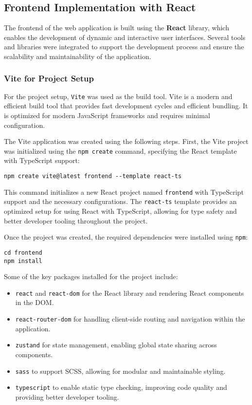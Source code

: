 \subsection{Frontend Implementation with React}

The frontend of the web application is built using the \textbf{React} library, which enables the development of dynamic and interactive user interfaces. Several tools and libraries were integrated to support the development process and ensure the scalability and maintainability of the application.

\subsubsection{Vite for Project Setup}

For the project setup, \texttt{Vite} was used as the build tool. Vite is a modern and efficient build tool that provides fast development cycles and efficient bundling. It is optimized for modern JavaScript frameworks and requires minimal configuration.

The Vite application was created using the following steps. First, the Vite project was initialized using the \texttt{npm create} command, specifying the React template with TypeScript support:

\begin{verbatim}
npm create vite@latest frontend --template react-ts
\end{verbatim}

This command initializes a new React project named \texttt{frontend} with TypeScript support and the necessary configurations. The \texttt{react-ts} template provides an optimized setup for using React with TypeScript, allowing for type safety and better developer tooling throughout the project.

Once the project was created, the required dependencies were installed using \texttt{npm}:

\begin{verbatim}
cd frontend
npm install
\end{verbatim}

Some of the key packages installed for the project include:

\begin{itemize}
    \item \texttt{react} and \texttt{react-dom} for the React library and rendering React components in the DOM.
    \item \texttt{react-router-dom} for handling client-side routing and navigation within the application.
    \item \texttt{zustand} for state management, enabling global state sharing across components.
    \item \texttt{sass} to support SCSS, allowing for modular and maintainable styling.
    \item \texttt{typescript} to enable static type checking, improving code quality and providing better developer tooling.
\end{itemize}

